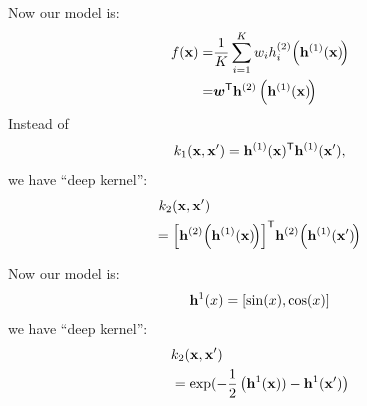 \newsavebox\deepkernels
\begin{lrbox}{\deepkernels}
  \begin{minipage}{0.4\textwidth}
Now our model is:
    \begin{align*}
f({\bf{x}}) = & \frac{1}{K} \sum_{i=1}^K w_i h_i^{(2)} \! \left( {\bf{h}}^{(1)}({\bf{x}}) \! \right) \\
= & \bm{w}^\mathsf{T} {\bf{h}}^{(2)} \left( {\bf{h}}^{(1)}({\bf{x}}) \! \right)
    \end{align*} 
	Instead of 
	$$k_1({\bf{x}}, {\bf{x}}') = {\bf{h}}^{(1)}({\bf{x}}) ^\mathsf{T} {\bf{h}}^{(1)}({\bf{x}}'),$$
	we have ``deep kernel'':
	\begin{align*}
	& k_2({\bf{x}}, {\bf{x}}') \\ 
	 & \!\! = \left[ {\bf{h}}^{(2)} \! \left( {\bf{h}}^{(1)}({\bf{x}}) \! \right) \right] ^\mathsf{T} \! {\bf{h}}^{(2)} \! \left( {\bf{h}}^{(1)}({\bf{x}}') \! \right)
	\end{align*}
  \end{minipage}
\end{lrbox}




\newsavebox\deepkernelstwo
\begin{lrbox}{\deepkernelstwo}
  \begin{minipage}{0.4\textwidth}
Now our model is:
    \begin{align*}
{\bf{h}}^{1}(x) = \left[ \sin(x), \cos(x) \right]
    \end{align*} 
	we have ``deep kernel'':
	\begin{align*}
	& k_2({\bf{x}}, {\bf{x}}') \\ 
	& = \exp(-\frac{1}{2} \left( {\bf{h}}^{1}({\bf{x}})) - {\bf{h}}^{1}({\bf{x}}') \right)
	\end{align*}
  \end{minipage}
\end{lrbox}

\newcommand{\numhiddenper}[0]{2}




\def\halfshift{0.67cm}

\newcommand{\neuronfunc}[2]{
\FPeval{\result}{clip(#1+#2)}
\texttt{[image: figures/two-d-draws/sqexp-draw-\\result]}
}


